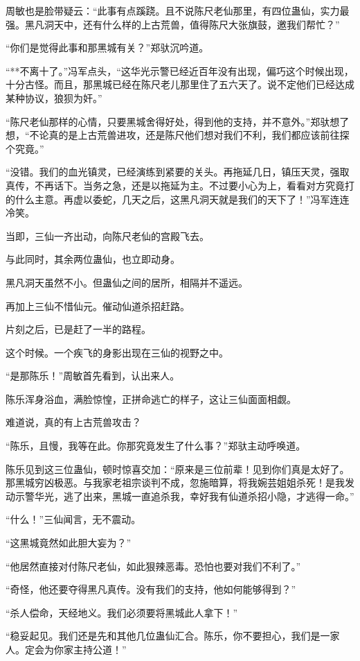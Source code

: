 \begin{this_body}
周敏也是脸带疑云：“此事有点蹊跷。且不说陈尺老仙那里，有四位蛊仙，实力最强。黑凡洞天中，还有什么样的上古荒兽，值得陈尺大张旗鼓，邀我们帮忙？”

“你们是觉得此事和那黑城有关？”郑驮沉吟道。

“**不离十了。”冯军点头，“这华光示警已经近百年没有出现，偏巧这个时候出现，十分古怪。而且，那黑城已经在陈尺老儿那里住了五六天了。说不定他们已经达成某种协议，狼狈为奸。”

“陈尺老仙那样的心情，只要黑城舍得好处，得到他的支持，并不意外。”郑驮想了想，“不论真的是上古荒兽进攻，还是陈尺他们想对我们不利，我们都应该前往探个究竟。”

“没错。我们的血光镇灵，已经演练到紧要的关头。再拖延几日，镇压天灵，强取真传，不再话下。当务之急，还是以拖延为主。不过要小心为上，看看对方究竟打的什么主意。再虚以委蛇，几天之后，这黑凡洞天就是我们的天下了！”冯军连连冷笑。

当即，三仙一齐出动，向陈尺老仙的宫殿飞去。

与此同时，其余两位蛊仙，也立即动身。

黑凡洞天虽然不小。但蛊仙之间的居所，相隔并不遥远。

再加上三仙不惜仙元。催动仙道杀招赶路。

片刻之后，已是赶了一半的路程。

这个时候。一个疾飞的身影出现在三仙的视野之中。

“是那陈乐！”周敏首先看到，认出来人。

陈乐浑身浴血，满脸惊惶，正拼命逃亡的样子，这让三仙面面相觑。

难道说，真的有上古荒兽攻击？

“陈乐，且慢，我等在此。你那究竟发生了什么事？”郑驮主动呼唤道。

陈乐见到这三位蛊仙，顿时惊喜交加：“原来是三位前辈！见到你们真是太好了。那黑城穷凶极恶。与我家老祖宗谈判不成，忽施暗算，将我婉芸姐姐杀死！是我发动示警华光，逃了出来，黑城一直追杀我，幸好我有仙道杀招小隐，才逃得一命。”

“什么！”三仙闻言，无不震动。

“这黑城竟然如此胆大妄为？”

“他居然直接对付陈尺老仙，如此狠辣恶毒。恐怕也要对我们不利了。”

“奇怪，他还要夺得黑凡真传。没有我们的支持，他如何能够得到？”

“杀人偿命，天经地义。我们必须要将黑城此人拿下！”

“稳妥起见。我们还是先和其他几位蛊仙汇合。陈乐，你不要担心，我们是一家人。定会为你家主持公道！”


\end{this_body}
